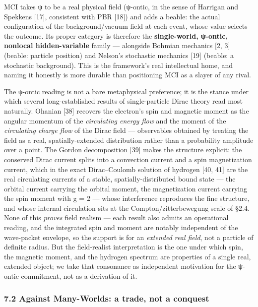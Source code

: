 \documentclass[
]{article}
\begin{document}
MCI takes ψ to be a real physical field (ψ-ontic, in the sense of
Harrigan and Spekkens {[}17{]}, consistent with PBR {[}18{]}) and adds a
beable: the actual configuration of the background/vacuum field at each
event, whose value selects the outcome. Its proper category is therefore
the \textbf{single-world, ψ-ontic, nonlocal hidden-variable} family ---
alongside Bohmian mechanics {[}2, 3{]} (beable: particle position) and
Nelson's stochastic mechanics {[}19{]} (beable: a stochastic
background). This is the framework's real intellectual home, and naming
it honestly is more durable than positioning MCI as a slayer of any
rival.

The ψ-ontic reading is not a bare metaphysical preference; it is the
stance under which several long-established results of single-particle
Dirac theory read most naturally. Ohanian {[}38{]} recovers the
electron's spin and magnetic moment as the angular momentum of the
\emph{circulating energy flow} and the moment of the \emph{circulating
charge flow} of the Dirac field --- observables obtained by treating the
field as a real, spatially-extended distribution rather than a
probability amplitude over a point. The Gordon decomposition {[}39{]}
makes the structure explicit: the conserved Dirac current splits into a
convection current and a spin magnetization current, which in the exact
Dirac--Coulomb solution of hydrogen {[}40, 41{]} are the real
circulating currents of a stable, spatially-distributed bound state ---
the orbital current carrying the orbital moment, the magnetization
current carrying the spin moment with g = 2 --- whose interference
reproduces the fine structure, and whose internal circulation sits at
the Compton/zitterbewegung scale of §2.4. None of this \emph{proves}
field realism --- each result also admits an operational reading, and
the integrated spin and moment are notably independent of the
wave-packet envelope, so the support is for an \emph{extended real
field}, not a particle of definite radius. But the field-realist
interpretation is the one under which spin, the magnetic moment, and the
hydrogen spectrum are properties of a single real, extended object; we
take that consonance as independent motivation for the ψ-ontic
commitment, not as a derivation of it.

\subsubsection{7.2 Against Many-Worlds: a trade, not a
conquest}\label{against-many-worlds-a-trade-not-a-conquest}
\end{document}
